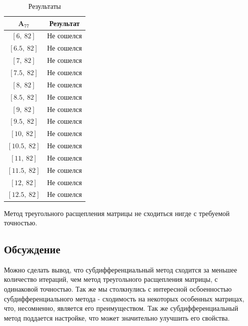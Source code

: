 \documentclass{article}
\begin{document}
    \begin{table}[H]
			\centering
			\begin{tabular}{|c|c|}
				\hline
				$\textbf{A}_{77}$ & Результат\\
				
				\hline
				$[6, \ 82]$ & Не сошелся \\
				
				\hline
				$[6.5, \ 82]$ & Не сошелся \\
				
				\hline
				$[7, \ 82]$ & Не сошелся \\
				
				\hline
				$[7.5, \ 82]$ & Не сошелся \\
				
				\hline
				$[8, \ 82]$ & Не сошелся \\
				
				\hline
				$[8.5, \ 82]$ & Не сошелся \\
				
				\hline
				$[9, \ 82]$ & Не сошелся \\
				
				\hline
				$[9.5, \ 82]$ & Не сошелся \\
				
				\hline
				$[10, \ 82]$ & Не сошелся \\
				
				\hline
				$[10.5, \ 82]$ & Не сошелся \\
				
				\hline
				$[11, \ 82]$ & Не сошелся \\
				
				\hline
				$[11.5, \ 82]$ & Не сошелся \\
				
				\hline
				$[12, \ 82]$ & Не сошелся \\
				
				\hline
				$[12.5, \ 82]$ & Не сошелся \\

				\hline
				
			\end{tabular}
			\caption{Результаты}
		\end{table}
	    
	    Метод треугольного расщепления матрицы не сходиться нигде с требуемой точностью.
	    
    \subsection{Обсуждение}
    Можно сделать вывод, что субдифференциальный метод сходится за меньшее количество итераций, чем метод треугольного расщепления матрицы, с одинаковой точностью. Так же мы столкнулись с интересной осбоенностью субдифференциального метода - сходимость на некоторых особенных матрицах, что, несомненно, является его преимуществом. Так же субдифференциальный метод поддается настройке, что может значительно улучшить его свойства.
    
\end{document}
